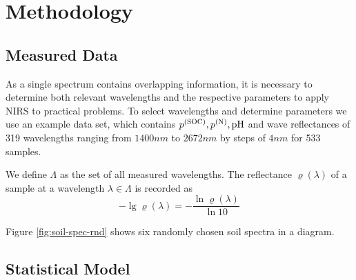 \section{Methodology}
\label{sec:methodology}
	
	\subsection{Measured Data}
	\label{ssec:measured-data}
	
		
		As a single spectrum contains overlapping information, it is necessary to determine both relevant wavelengths and the respective parameters to apply NIRS to practical problems.
		To select wavelengths and determine parameters we use an example data set, which contains $p^{\mathrm{(SOC)}},p^{\mathrm{(N)}},\mathrm{pH}$ and wave reflectances of 319 wavelengths ranging from $1400 \unit{nm}$ to $2672 \unit{nm}$ by steps of $4 \unit{nm}$ for 533 samples.%

		We define $\Lambda$ as the set of all measured wavelengths. The reflectance $\varrho(\lambda)$ of a sample at a wavelength $\lambda \in \Lambda$ is recorded as
		\[
			-\lg \varrho(\lambda) = -\frac{\ln \varrho(\lambda)}{\ln 10}
		\]
		
		\begin{figure*}
			\centering
			
			\caption{This figure shows near infrared soil spectra of six randomly chosen soil samples obtained from the used dataframe.}
			\label{fig:soil-spec-rnd}
		\end{figure*}

		
		Figure \ref{fig:soil-spec-rnd} shows six randomly chosen soil spectra in a diagram.
	

	\subsection{Statistical Model}
	\label{ssec:statistical-model}
	
